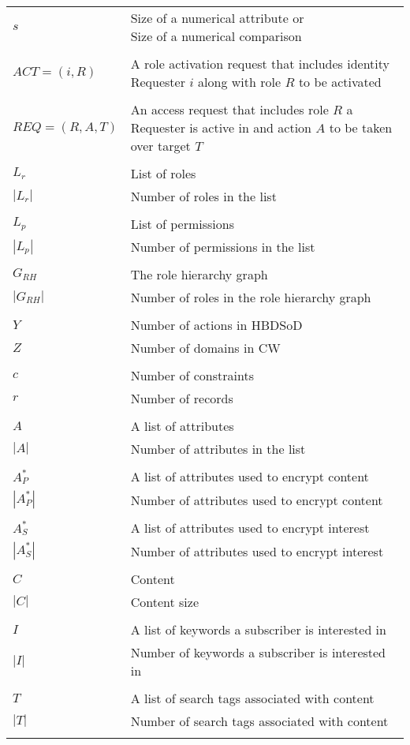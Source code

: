 \documentclass[epsfig,a4paper,11pt,titlepage]{book}
\numberwithin{algorithm}{chapter}
\begin{document}
\begin{longtable}{l l}
$s$ & \makecell[l]{Size of a numerical attribute or \\ Size of a numerical comparison} \\ \\
$\mathit{ACT} = (i, R)$ & \makecell[l]{A role activation request that includes identity Requester $i$ \\ along with role $R$ to be activated} \\ \\
$\mathit{REQ} = (R, A, T)$ & \makecell[l]{An access request that includes role $R$ a Requester is active in and \\ action $A$ to be taken over target $T$} \\ \\
$L_r$ & List of roles \\
$|L_r|$ & Number of roles in the list \\ \\
$L_p$ & List of permissions \\
$|L_p|$ & Number of permissions in the list \\ \\
$G_{RH}$ & The role hierarchy graph \\
$|G_{RH}|$ & Number of roles in the role hierarchy graph \\ \\
$Y$ & Number of actions in \acrshort{HBDSoD} \\
$Z$ & Number of domains in \acrshort{CW} \\ \\
$c$ & Number of constraints \\
$r$ & Number of records \\ \\
$A$ & A list of attributes \\
$|A|$ & Number of attributes in the list \\ \\
$A_P^*$ & A list of attributes used to encrypt content \\
$|A_P^*|$ & Number of attributes used to encrypt content \\ \\
$A_S^*$ & A list of attributes used to encrypt interest \\
$|A_S^*|$ & Number of attributes used to encrypt interest \\ \\
$C$ & Content \\
$|C|$ & Content size \\ \\
$I$ & A list of keywords a subscriber is interested in \\
$|I|$ & Number of keywords a subscriber is interested in \\ \\
$T$ & A list of search tags associated with content \\
$|T|$ & Number of search tags associated with content \\ \\
\end{longtable}
\end{document}
